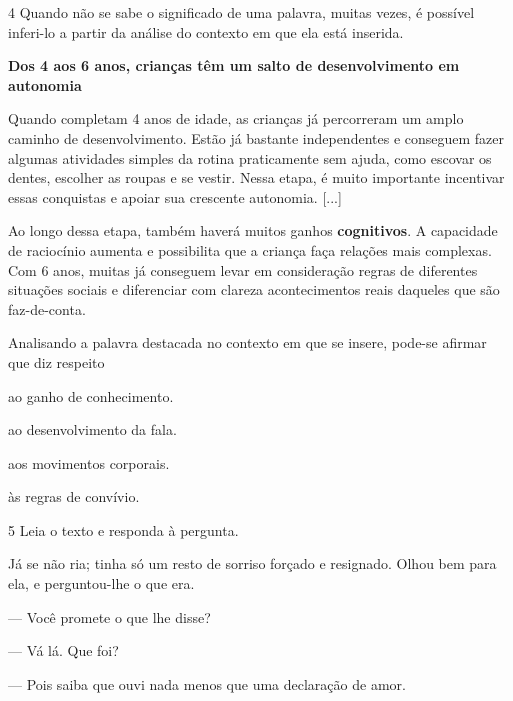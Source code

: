 \num{4} Quando não se sabe o significado de uma palavra, muitas vezes, é
possível inferi-lo a partir da análise do contexto em que ela está
inserida.

\begin{myquote}
\textbf{Dos 4 aos 6 anos, crianças têm um salto de desenvolvimento em autonomia}

Quando completam 4 anos de idade, as crianças já percorreram um amplo
caminho de desenvolvimento. Estão já bastante independentes e conseguem
fazer algumas atividades simples da rotina praticamente sem ajuda, como
escovar os dentes, escolher as roupas e se vestir. Nessa etapa, é muito
importante incentivar essas conquistas e apoiar sua crescente autonomia.
{[}...{]}

Ao longo dessa etapa, também haverá muitos ganhos \textbf{cognitivos}. A
capacidade de raciocínio aumenta e possibilita que a criança faça
relações mais complexas. Com 6 anos, muitas já conseguem levar em
consideração regras de diferentes situações sociais e diferenciar com
clareza acontecimentos reais daqueles que são faz-de-conta.

\end{myquote}

Analisando a palavra destacada no contexto em que se insere, 
pode-se afirmar que diz respeito

\begin{escolha}
\item ao ganho de conhecimento.

\item ao desenvolvimento da fala.

\item aos movimentos corporais.

\item às regras de convívio.
\end{escolha}

\num{5} Leia o texto e responda à pergunta.

\begin{myquote}
Já se não ria; tinha só um resto de sorriso forçado e resignado. Olhou
bem para ela, e perguntou-lhe o que era.

--- Você promete o que lhe disse?

--- Vá lá. Que foi?

--- Pois saiba que ouvi nada menos que uma declaração de amor.

\end{myquote}

